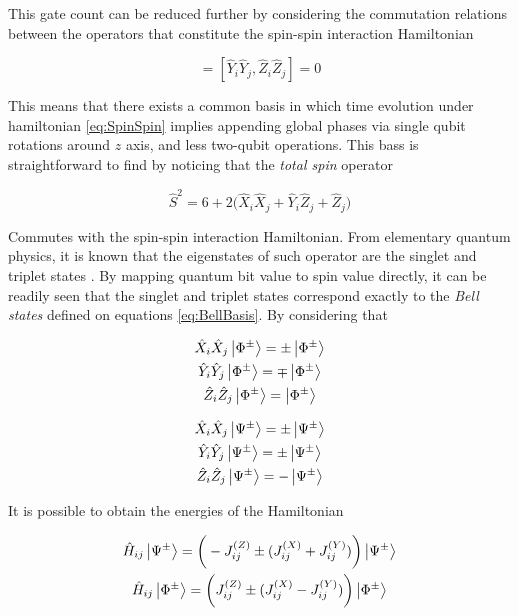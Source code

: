   This gate count can be reduced further by considering the commutation relations between the operators that constitute the spin-spin interaction Hamiltonian

  \begin{equation}
    [\hat{X}_i\hat{X}_j, \hat{Z}_i\hat{Z}_j] = [\hat{Y}_i\hat{Y}_j, \hat{Z}_i\hat{Z}_j] = 0
    \label{eq:CommutationRelations}
  \end{equation}

  This means that there exists a common basis in which time evolution under hamiltonian \ref{eq:SpinSpin} implies appending global phases via single qubit rotations around $\hat{z}$ axis, and less two-qubit operations. This bass is straightforward to find by noticing that the \textit{total spin} operator

  \begin{equation}
    \hat{S}^2 = 6 + 2\Big(\hat{X}_i\hat{X}_j + \hat{Y}_i\hat{Z}_j + \hat{Z}_j\Big) 
    \label{eq:TotalSpin}
  \end{equation}

  Commutes with the spin-spin interaction Hamiltonian. From elementary quantum physics, it is known that the eigenstates of such operator are the singlet and triplet states \cite{Beck}. By mapping quantum bit value to spin value directly, it can be readily seen that the singlet and triplet states correspond exactly to the \textit{Bell states} defined on equations \ref{eq:BellBasis}. By considering that

  \begin{gather}
    \hat{X}_i\hat{X}_j \ket{\Phi^{\pm}} = \pm\ket{\Phi^{\pm}} \\
    \hat{Y}_i\hat{Y}_j \ket{\Phi^{\pm}} = \mp\ket{\Phi^{\pm}} \\
    \hat{Z}_i\hat{Z}_j \ket{\Phi^{\pm}} = \ket{\Phi^{\pm}}
    \label{eq:PhiBellBasisOps}
  \end{gather}

  \begin{gather}
    \hat{X}_i\hat{X}_j \ket{\Psi^{\pm}} = \pm\ket{\Psi^{\pm}} \\
    \hat{Y}_i\hat{Y}_j \ket{\Psi^{\pm}} = \pm\ket{\Psi^{\pm}} \\
    \hat{Z}_i\hat{Z}_j \ket{\Psi^{\pm}} = -\ket{\Psi^{\pm}}
    \label{eq:PsiBellBasisOps}
  \end{gather}

  It is possible to obtain the energies of the Hamiltonian

  \begin{gather}
    \hat{H}_{ij} \ket{\Psi^{\pm}} = \bigg(-J_{ij}^{(Z)} \pm (J_{ij}^{(X)} + J_{ij}^{(Y)})\bigg) \ket{\Psi^{\pm}} \\
    \hat{H}_{ij} \ket{\Phi^{\pm}} = \bigg(J_{ij}^{(Z)} \pm (J_{ij}^{(X)} - J_{ij}^{(Y)})\bigg) \ket{\Phi^{\pm}}
    \label{eq:SpinSpinEnergies}
  \end{gather}

